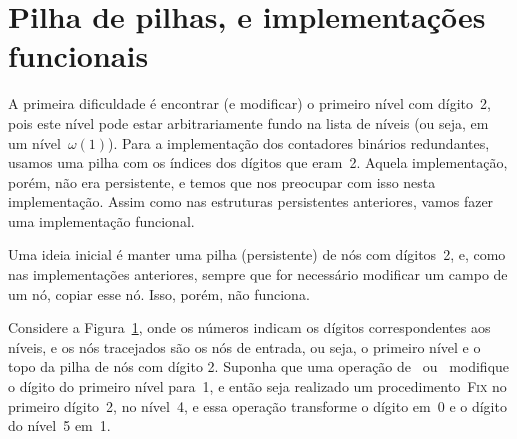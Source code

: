 \documentclass[main.tex]{subfiles}
\begin{document}
\section{Pilha de pilhas, e implementações funcionais} \label{sec:implfunc}

A primeira dificuldade é encontrar (e modificar) o primeiro nível com dígito~2, pois este nível pode estar arbitrariamente fundo na lista de níveis (ou seja, em um nível~$\omega(1)$). Para a implementação dos contadores binários redundantes, usamos uma pilha com os índices dos dígitos que eram~2. Aquela implementação, porém, não era persistente, e temos que nos preocupar com isso nesta implementação. Assim como nas estruturas persistentes anteriores, vamos fazer uma implementação funcional.


\begin{figure}
\centering
{}
\caption{} \label{fig:func_ex1}
\end{figure}

Uma ideia inicial é manter uma pilha (persistente) de nós com dígitos~2, e, como nas implementações anteriores, sempre que for necessário modificar um campo de um nó, copiar esse nó. Isso, porém, não funciona.

Considere a Figura~\ref{fig:func_ex1}, onde os números indicam os dígitos correspondentes aos níveis, e os nós tracejados são os nós de entrada, ou seja, o primeiro nível e o topo da pilha de nós com dígito 2. Suponha que uma operação de~ ou~ modifique o dígito do primeiro nível para~1, e então seja realizado um procedimento~\textsc{Fix} no primeiro dígito~2, no nível~4, e essa operação transforme o dígito em~0 e o dígito do nível~5 em~1.
\end{document}
